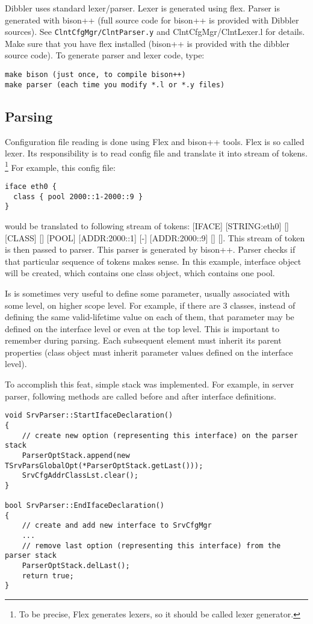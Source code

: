 Dibbler uses standard lexer/parser. Lexer is generated using flex. Parser is
generated with bison++ (full source code for bison++ is provided with
Dibbler sources). See \verb+ClntCfgMgr/ClntParser.y+ and
ClntCfgMgr/ClntLexer.l for details. Make sure that you have flex installed
(bison++ is provided with the dibbler source code). To generate parser
and lexer code, type:

\begin{verbatim}
make bison (just once, to compile bison++)
make parser (each time you modify *.l or *.y files)
\end{verbatim}

\subsection{Parsing}
Configuration file reading is done using Flex and bison++ tools. Flex
is so called lexer. Its responsibility is to read config file and
translate it into stream of tokens. \footnote{To be precise, Flex
  generates lexers, so it should be called lexer generator.} For
example, this config file:
\begin{verbatim}
iface eth0 {
  class { pool 2000::1-2000::9 }
}
\end{verbatim}

would be translated to following stream of tokens: [IFACE]
[STRING:eth0] [{] [CLASS] [{] [POOL] [ADDR:2000::1] [-] [ADDR:2000::9]
[}] [}]. This stream of token is then passed to parser. This parser is
generated by bison++. Parser checks if that particular sequence of
tokens makes sense. In this example, interface object will be created,
which contains one class object, which contains one pool.

Is is sometimes very useful to define some parameter, usually
associated with some level, on higher scope level. For example, if
there are 3 classes, instead of defining the same valid-lifetime value
on each of them, that parameter may be defined on the interface
level or even at the top level. This is important to remember during
parsing. Each subsequent element must inherit its parent properties
(class object must inherit parameter values defined on the interface
level).

To accomplish this feat, simple stack was implemented. For example, in
server parser, following methods are called before and after interface
definitions.

\begin{verbatim}
void SrvParser::StartIfaceDeclaration()
{
    // create new option (representing this interface) on the parser stack
    ParserOptStack.append(new TSrvParsGlobalOpt(*ParserOptStack.getLast()));
    SrvCfgAddrClassLst.clear();
}

bool SrvParser::EndIfaceDeclaration()
{
    // create and add new interface to SrvCfgMgr
    ...
    // remove last option (representing this interface) from the parser stack
    ParserOptStack.delLast();
    return true;
}   
\end{verbatim}


